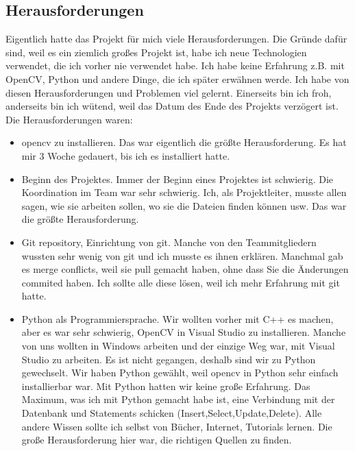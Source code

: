 \subsection{Herausforderungen}
Eigentlich hatte das Projekt f\"ur mich viele Herausforderungen. Die Gr\"unde daf\"ur sind, weil es ein ziemlich gro{\ss}es Projekt ist, habe ich neue Technologien verwendet, die ich vorher nie verwendet habe. Ich habe keine Erfahrung z.B. mit OpenCV, Python und andere Dinge, die ich sp\"ater erw\"ahnen werde. Ich habe von diesen Herausforderungen und Problemen viel gelernt. Einerseits bin ich froh, anderseits bin ich w\"utend, weil das Datum des Ende des Projekts verz\"ogert ist. 
Die Herausforderungen waren:

\begin{itemize}
	\item opencv zu installieren. Das war eigentlich die gr\"o{\ss}te Herausforderung. Es hat mir 3 Woche gedauert, bis ich es installiert hatte. 
	
	\item Beginn des Projektes. Immer der Beginn eines Projektes ist schwierig. Die Koordination im Team war sehr schwierig. Ich, als Projektleiter, musste allen sagen, wie sie arbeiten sollen, wo sie die Dateien finden k\"onnen usw. Das war die gr\"o{\ss}te Herausforderung.
		
	\item Git repository, Einrichtung von git. Manche von den Teammitgliedern wussten sehr wenig von git und ich musste es ihnen erkl\"aren. Manchmal gab es merge conflicts, weil sie pull gemacht haben, ohne dass Sie die \"Anderungen commited haben. Ich sollte alle diese l\"osen, weil ich mehr Erfahrung mit git hatte. 
	
	\item Python als Programmiersprache. Wir wollten vorher mit C++ es machen, aber es war sehr schwierig, OpenCV in Visual Studio zu installieren. Manche von uns wollten in Windows arbeiten und der einzige Weg war, mit Visual Studio zu arbeiten. Es ist nicht gegangen, deshalb sind wir zu Python gewechselt. Wir haben Python gew\"ahlt, weil opencv in Python sehr einfach installierbar war. Mit Python hatten wir keine gro{\ss}e Erfahrung. Das Maximum, was ich mit Python gemacht habe ist, eine Verbindung mit der Datenbank und Statements schicken (Insert,Select,Update,Delete). Alle andere Wissen sollte ich selbst von B\"ucher, Internet, Tutorials lernen. Die gro{\ss}e Herausforderung hier war, die richtigen Quellen zu finden.
	

\end{itemize}
